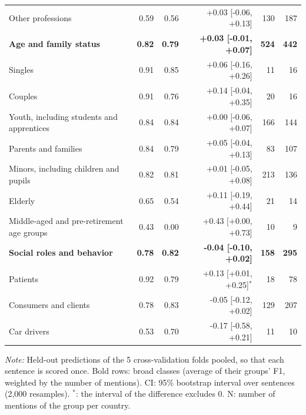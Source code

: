\begin{table}[htbp]
\begin{threeparttable}
\begin{tabular}{l rr r rr}
\quad Other professions & 0.59 & 0.56 & +0.03 [-0.06, +0.13] & 130 & 187 \\
\addlinespace
\textbf{Age and family status} & \textbf{0.82} & \textbf{0.79} & \textbf{+0.03 [-0.01, +0.07]} & \textbf{524} & \textbf{442} \\
\quad Singles & 0.91 & 0.85 & +0.06 [-0.16, +0.26] & 11 & 16 \\
\quad Couples & 0.91 & 0.76 & +0.14 [-0.04, +0.35] & 20 & 16 \\
\quad Youth, including students and apprentices & 0.84 & 0.84 & +0.00 [-0.06, +0.07] & 166 & 144 \\
\quad Parents and families & 0.84 & 0.79 & +0.05 [-0.04, +0.13] & 83 & 107 \\
\quad Minors, including children and pupils & 0.82 & 0.81 & +0.01 [-0.05, +0.08] & 213 & 136 \\
\quad Elderly & 0.65 & 0.54 & +0.11 [-0.19, +0.44] & 21 & 14 \\
\quad Middle-aged and pre-retirement age groups & 0.43 & 0.00 & +0.43 [+0.00, +0.73] & 10 & 9 \\
\addlinespace
\textbf{Social roles and behavior} & \textbf{0.78} & \textbf{0.82} & \textbf{-0.04 [-0.10, +0.02]} & \textbf{158} & \textbf{295} \\
\quad Patients & 0.92 & 0.79 & +0.13 [+0.01, +0.25]$^{*}$ & 18 & 78 \\
\quad Consumers and clients & 0.78 & 0.83 & -0.05 [-0.12, +0.02] & 129 & 207 \\
\quad Car drivers & 0.53 & 0.70 & -0.17 [-0.58, +0.21] & 11 & 10 \\
\bottomrule
\end{tabular}
\begin{tablenotes}[flushleft]
\footnotesize
\item \textit{Note:} Held-out predictions of the 5 cross-validation folds pooled, so that each sentence is scored once. Bold rows: broad classes (average of their groups' F1, weighted by the number of mentions). CI: 95\% bootstrap interval over sentences (2,000 resamples). $^{*}$: the interval of the difference excludes 0. N: number of mentions of the group per country.
\end{tablenotes}
\end{threeparttable}
\end{table}
